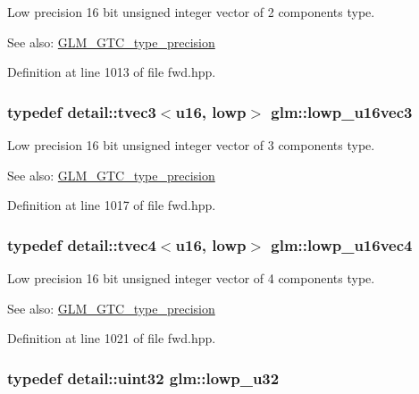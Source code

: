 Low precision 16 bit unsigned integer vector of 2 components type. \begin{Desc}
\item[See also:]\hyperlink{group__gtc__type__precision}{GLM\_\-GTC\_\-type\_\-precision} \end{Desc}


Definition at line 1013 of file fwd.hpp.\hypertarget{group__gtc__type__precision_g74d5491c9ee66d068309d200601e907b}{
\subsubsection[lowp\_\-u16vec3]{\setlength{\rightskip}{0pt plus 5cm}typedef detail::tvec3$<$u16, lowp$>$ {\bf glm::lowp\_\-u16vec3}}}
\label{group__gtc__type__precision_g74d5491c9ee66d068309d200601e907b}


Low precision 16 bit unsigned integer vector of 3 components type. \begin{Desc}
\item[See also:]\hyperlink{group__gtc__type__precision}{GLM\_\-GTC\_\-type\_\-precision} \end{Desc}


Definition at line 1017 of file fwd.hpp.\hypertarget{group__gtc__type__precision_gb0210f390e7d75fa8eb42128a05ff23a}{
\subsubsection[lowp\_\-u16vec4]{\setlength{\rightskip}{0pt plus 5cm}typedef detail::tvec4$<$u16, lowp$>$ {\bf glm::lowp\_\-u16vec4}}}
\label{group__gtc__type__precision_gb0210f390e7d75fa8eb42128a05ff23a}


Low precision 16 bit unsigned integer vector of 4 components type. \begin{Desc}
\item[See also:]\hyperlink{group__gtc__type__precision}{GLM\_\-GTC\_\-type\_\-precision} \end{Desc}


Definition at line 1021 of file fwd.hpp.\hypertarget{group__gtc__type__precision_gba06fae1dd98ca50c017e68345df0365}{
\subsubsection[lowp\_\-u32]{\setlength{\rightskip}{0pt plus 5cm}typedef detail::uint32 {\bf glm::lowp\_\-u32}}}
\label{group__gtc__type__precision_gba06fae1dd98ca50c017e68345df0365}


